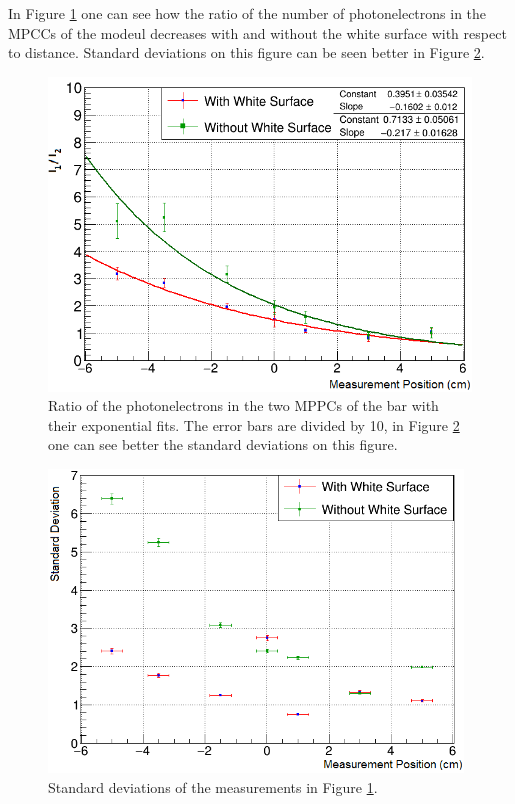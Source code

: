 \documentclass[a4paper]{article}\linespread{1.4}
\begin{document}
In Figure \ref{fig:s0os1} one can see how the ratio of the number of photonelectrons in the MPCCs of the modeul decreases with and without the white surface with respect to distance. Standard deviations on this figure can be seen better in Figure \ref{fig:s0os1e}.
\begin{figure}[] \centering \includegraphics[width=120mm,scale=1.0]{figures/s0os1.png} \caption{Ratio of the photonelectrons in the two MPPCs of the bar with their exponential fits. The error bars are divided by 10, in Figure \ref{fig:s0os1e} one can see better the standard deviations on this figure.} \label{fig:s0os1} \end{figure}  
\begin{figure}[] \centering \includegraphics[width=110mm,scale=1.0]{figures/s0os1e.png} \caption{ Standard deviations of the measurements in Figure \ref{fig:s0os1}.} \label{fig:s0os1e} \end{figure}  
\end{document}
